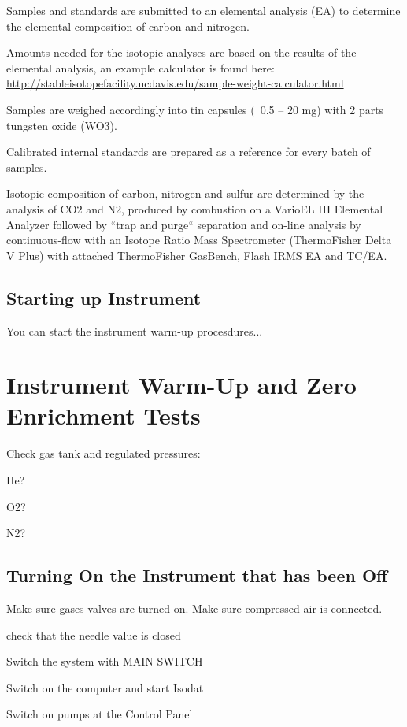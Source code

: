 \documentclass[12pt]{../SOP3}\usepackage[]{graphicx}\usepackage[]{color}
\begin{document}
\NP Samples and standards are submitted to an elemental analysis (EA) to determine the elemental composition of carbon and nitrogen. 

\NP Amounts needed for the isotopic analyses are based on the results of the elemental analysis, an example calculator is found here: \url{http://stableisotopefacility.ucdavis.edu/sample-weight-calculator.html}

\NP Samples are weighed accordingly into tin capsules (~0.5 – 20 mg) with 2 parts tungsten oxide (WO3).

\NP Calibrated internal standards are prepared as a reference for every batch of samples.


\NP Isotopic composition of carbon, nitrogen and sulfur are determined by the analysis of CO2 and N2, produced by combustion on a VarioEL III Elemental Analyzer followed by ``trap and purge`` separation and on-line analysis by continuous-flow with an Isotope Ratio Mass Spectrometer (ThermoFisher Delta V Plus) with attached ThermoFisher GasBench, Flash IRMS EA and TC/EA. 

\subsection{Starting up Instrument}

\NP You can start the instrument warm-up procesdures... 

\section{Instrument Warm-Up and Zero Enrichment Tests}

\NP Check gas tank and regulated pressures:

He?

O2?

N2?


\subsection{Turning On the Instrument that has been Off}

\NP Make sure gases valves are turned on. Make sure compressed air is connceted.

\NP check that the needle value is closed

\NP Switch the system with MAIN SWITCH

\NP Switch on the computer and start Isodat

\NP Switch on pumps at the Control Panel
\end{document}

